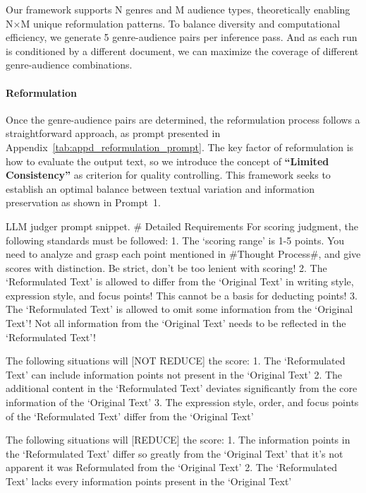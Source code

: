 Our framework supports N genres and M audience types, theoretically enabling N×M unique reformulation patterns.
To balance diversity and computational efficiency, we generate 5 genre-audience pairs per inference pass.
And as each run is conditioned by a different document, we can maximize the coverage of different genre-audience combinations.

\paragraph{Reformulation}
Once the genre-audience pairs are determined, the reformulation process follows a straightforward approach,
as prompt presented in Appendix~\ref{tab:appd_reformulation_prompt}.
The key factor of reformulation is how to evaluate the output text,
so we introduce the concept of \textbf{``Limited Consistency''} as criterion for quality controlling. 
This framework seeks to establish an optimal balance between textual variation and information preservation as shown in Prompt~1. 


\begin{table*}[!hbt]
\begin{prompt}{LLM judger prompt snippet.}
# Detailed Requirements
For scoring judgment, the following standards must be followed:
1. The `scoring range' is 1-5 points. You need to analyze and grasp each point mentioned in #Thought Process#, and give scores with distinction. Be strict, don't be too lenient with scoring!
2. The `Reformulated Text' is allowed to differ from the `Original Text' in writing style, expression style, and focus points! This cannot be a basis for deducting points!
3. The `Reformulated Text' is allowed to omit some information from the `Original Text'! Not all information from the `Original Text' needs to be reflected in the `Reformulated Text'!

The following situations will [NOT REDUCE] the score:
1. The `Reformulated Text' can include information points not present in the `Original Text'
2. The additional content in the `Reformulated Text' deviates significantly from the core information of the `Original Text'
3. The expression style, order, and focus points of the `Reformulated Text' differ from the `Original Text'

The following situations will [REDUCE] the score:
1. The information points in the `Reformulated Text' differ so greatly from the `Original Text' that it's not apparent it was Reformulated from the `Original Text'
2. The `Reformulated Text' lacks every information points present in the `Original Text'
\end{prompt}
\vspace{-0.5em}
\end{table*}

